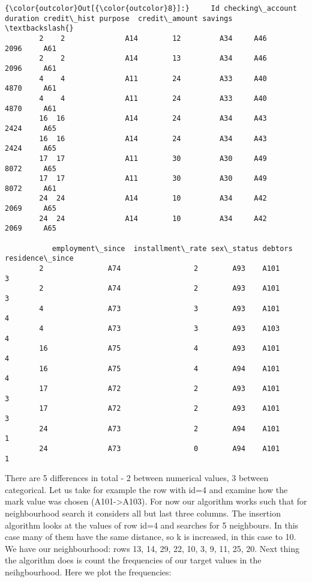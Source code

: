 \documentclass[11pt]{article}
\begin{document}
\begin{Verbatim}[commandchars=\\\{\}]
{\color{outcolor}Out[{\color{outcolor}8}]:}     Id checking\_account  duration credit\_hist purpose  credit\_amount savings  \textbackslash{}
        2    2              A14        12         A34     A46           2096     A61   
        2    2              A14        13         A34     A46           2096     A61   
        4    4              A11        24         A33     A40           4870     A61   
        4    4              A11        24         A33     A40           4870     A61   
        16  16              A14        24         A34     A43           2424     A65   
        16  16              A14        24         A34     A43           2424     A65   
        17  17              A11        30         A30     A49           8072     A65   
        17  17              A11        30         A30     A49           8072     A61   
        24  24              A14        10         A34     A42           2069     A65   
        24  24              A14        10         A34     A42           2069     A65   
        
           employment\_since  installment\_rate sex\_status debtors  residence\_since  
        2               A74                 2        A93    A101                3  
        2               A74                 2        A93    A101                3  
        4               A73                 3        A93    A101                4  
        4               A73                 3        A93    A103                4  
        16              A75                 4        A93    A101                4  
        16              A75                 4        A94    A101                4  
        17              A72                 2        A93    A101                3  
        17              A72                 2        A93    A101                3  
        24              A73                 2        A94    A101                1  
        24              A73                 0        A94    A101                1  
\end{Verbatim}
            
    There are 5 differences in total - 2 between numerical values, 3 between
categorical. Let us take for example the row with id=4 and examine how
the mark value was chosen (A101-\textgreater{}A103). For now our
algorithm works such that for neighbourhood search it considers all but
last three columns. The insertion algorithm looks at the values of row
id=4 and searches for 5 neighbours. In this case many of them have the
same distance, so k is increased, in this case to 10. We have our
neighbourhood: rows 13, 14, 29, 22, 10, 3, 9, 11, 25, 20. Next thing the
algorithm does is count the frequencies of our target values in the
neihgbourhood. Here we plot the frequencies:
\end{document}
